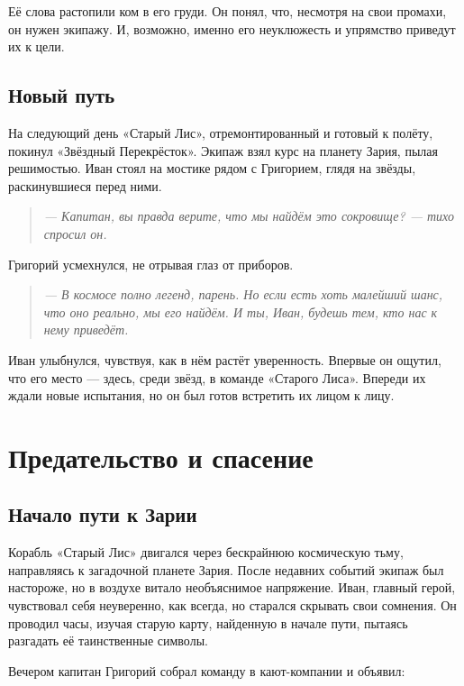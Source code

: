 \documentclass[12pt,a4paper]{book}
\newenvironment{dialogue}{\begin{quote}\itshape}{\end{quote}} %
\begin{document}
Её слова растопили ком в его груди. Он понял, что, несмотря на свои промахи, он нужен экипажу. И, возможно, именно его неуклюжесть и упрямство приведут их к цели.

\section*{Новый путь}

На следующий день «Старый Лис», отремонтированный и готовый к полёту, покинул «Звёздный Перекрёсток». Экипаж взял курс на планету Зария, пылая решимостью. Иван стоял на мостике рядом с Григорием, глядя на звёзды, раскинувшиеся перед ними.

\begin{dialogue}
--- Капитан, вы правда верите, что мы найдём это сокровище? --- тихо спросил он.
\end{dialogue}

Григорий усмехнулся, не отрывая глаз от приборов.

\begin{dialogue}
--- В космосе полно легенд, парень. Но если есть хоть малейший шанс, что оно реально, мы его найдём. И ты, Иван, будешь тем, кто нас к нему приведёт.
\end{dialogue}

Иван улыбнулся, чувствуя, как в нём растёт уверенность. Впервые он ощутил, что его место --- здесь, среди звёзд, в команде «Старого Лиса». Впереди их ждали новые испытания, но он был готов встретить их лицом к лицу.

\chapter{Предательство и спасение}

\section*{Начало пути к Зарии}

Корабль «Старый Лис» двигался через бескрайнюю космическую тьму, направляясь к загадочной планете Зария. После недавних событий экипаж был настороже, но в воздухе витало необъяснимое напряжение. Иван, главный герой, чувствовал себя неуверенно, как всегда, но старался скрывать свои сомнения. Он проводил часы, изучая старую карту, найденную в начале пути, пытаясь разгадать её таинственные символы.

Вечером капитан Григорий собрал команду в кают-компании и объявил:
\end{document}
